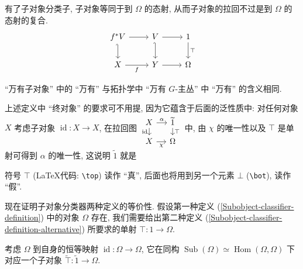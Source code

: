 有了子对象分类子, 子对象等同于到 $\Omega$ 的态射, 从而子对象的拉回不过是到 $\Omega$ 的态射的复合.
\[\begin{tikzcd}[ampersand replacement=\&]
	{f^*V} \& V \& 1 \\
	X \& Y \& \Omega
	\arrow[hook', from=1-1, to=2-1]
	\arrow["f"', from=2-1, to=2-2]
	\arrow[from=2-2, to=2-3]
	\arrow[from=1-1, to=1-2]
	\arrow[from=1-2, to=1-3]
	\arrow["\top", from=1-3, to=2-3]
	\arrow[hook', from=1-2, to=2-2]
\end{tikzcd}\]

\begin{remark}{}
    ``万有子对象'' 中的 ``万有'' 与拓扑学中 ``万有 $G$-主丛'' 中 ``万有'' 的含义相同.

    上述定义中 ``终对象'' 的要求可不用提, 因为它蕴含于后面的泛性质中: 对任何对象 $X$ 考虑子对象 $\operatorname{id}\colon X \to X$, 在拉回图
    $\begin{tikzcd}[ampersand replacement=\&,sep=small]
	X \& {\widetilde 1} \\
	X \& \Omega
	\arrow["{\operatorname{id}}"', from=1-1, to=2-1]
	\arrow["\alpha", from=1-1, to=1-2]
	\arrow["\chi"', from=2-1, to=2-2]
	\arrow["\top", from=1-2, to=2-2]
    \end{tikzcd}$
    中, 由 $\chi$ 的唯一性以及 $\top$ 是单射可得到 $\alpha$ 的唯一性, 这说明 $\widetilde 1$ 就是
    
    符号 $\top$ (\LaTeX 代码: \verb|\top|) 读作 ``真'', 后面也将用到另一个元素 $\bot$ (\verb|\bot|), 读作 ``假''.
\end{remark}

现在证明子对象分类器两种定义的等价性. 假设第一种定义 (\ref{Subobject-classifier-definition}) 中的对象 $\Omega$ 存在, 我们需要给出第二种定义 (\ref{Subobject-classifier-definition-alternative}) 所要求的单射 $\top\colon 1 \to \Omega$.

考虑 $\Omega$ 到自身的恒等映射 $\operatorname{id}\colon \Omega \to \Omega$, 它在同构 $\operatorname{Sub}(\Omega) \simeq \operatorname{Hom}(\Omega,\Omega)$ 下对应一个子对象 $\widetilde \top \colon \widetilde 1 \to \Omega$.

